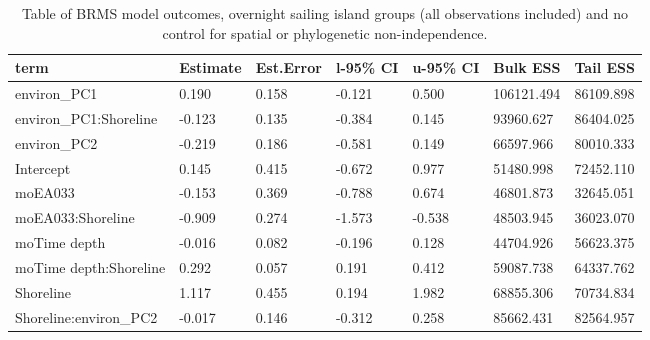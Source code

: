 \begin{table}[ht]
\centering
\begin{tabular}{p{4cm}p{1.65cm}p{1.65cm}p{1.65cm}p{1.65cm}p{1.65cm}p{1.65cm}}
  \toprule
term & Estimate & Est.Error & l-95\% CI & u-95\% CI & Bulk ESS & Tail ESS \\ 
  \midrule
environ\_PC1 & 0.190 & 0.158 & -0.121 & 0.500 & 106121.494 & 86109.898 \\ 
  environ\_PC1:Shoreline & -0.123 & 0.135 & -0.384 & 0.145 & 93960.627 & 86404.025 \\ 
  environ\_PC2 & -0.219 & 0.186 & -0.581 & 0.149 & 66597.966 & 80010.333 \\ 
  Intercept & 0.145 & 0.415 & -0.672 & 0.977 & 51480.998 & 72452.110 \\ 
  moEA033 & -0.153 & 0.369 & -0.788 & 0.674 & 46801.873 & 32645.051 \\ 
  moEA033:Shoreline & -0.909 & 0.274 & -1.573 & -0.538 & 48503.945 & 36023.070 \\ 
  moTime depth & -0.016 & 0.082 & -0.196 & 0.128 & 44704.926 & 56623.375 \\ 
  moTime depth:Shoreline & 0.292 & 0.057 & 0.191 & 0.412 & 59087.738 & 64337.762 \\ 
  Shoreline & 1.117 & 0.455 & 0.194 & 1.982 & 68855.306 & 70734.834 \\ 
  Shoreline:environ\_PC2 & -0.017 & 0.146 & -0.312 & 0.258 & 85662.431 & 82564.957 \\ 
   \bottomrule
\end{tabular}
\caption{Table of BRMS model outcomes, overnight sailing island groups (all observations included) and no control for spatial or phylogenetic non-independence.} 
\label{BRMS_effects_SBZR_control_none}
\end{table}
